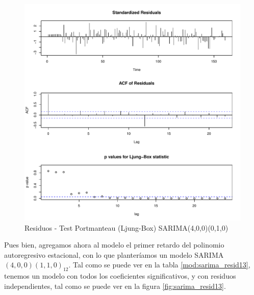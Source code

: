 \documentclass[12pt,oneside]{book}\usepackage[]{graphicx}\usepackage[]{color}
\makeatletter
\def\maxwidth{ %
  \ifdim\Gin@nat@width>\linewidth
    \linewidth
  \else
    \Gin@nat@width
  \fi
}
\newenvironment{knitrout}{}{} %
\theoremstyle{definition} %
\makeatother
\begin{document}
\begin{knitrout}
\color{fgcolor}\begin{figure}[H]

{\centering \includegraphics[width=\maxwidth]{figure/unnamed-chunk-16-1} 

}

\caption{\label{fig:sarima_resid12} Residuos - Test Portmanteau (Ljung-Box) SARIMA(4,0,0)(0,1,0)}\label{fig:unnamed-chunk-16}
\end{figure}


\end{knitrout}


Pues bien, agregamos ahora al modelo el primer retardo del polinomio autoregresivo estacional, con lo que planteríamos  un modelo SARIMA$(4,0,0)(1,1,0)_{12}$. Tal como se puede ver en la tabla \ref{mod:sarima_resid13}, tenemos un modelo con todos los coeficientes significativos, y con residuos independientes, tal como se puede ver en la figura \ref{fig:sarima_resid13}. 
\end{document}
